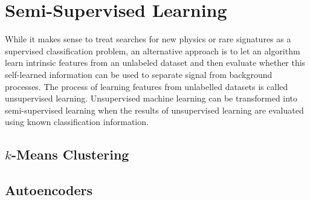 \section{Semi-Supervised Learning}
\label{sec:semisupervised}
While it makes sense to treat searches for new physics or rare signatures as a supervised classification problem, an alternative approach is to let an algorithm learn intrinsic features from an unlabeled dataset and then evaluate whether this self-learned information can be used to separate signal from background processes. The process of learning features from unlabelled datasets is called unsupervised learning. Unsupervised machine learning can be transformed into semi-supervised learning when the results of unsupervised learning are evaluated using known classification information.

\subsection{$k$-Means Clustering}
%

\subsection{Autoencoders}


